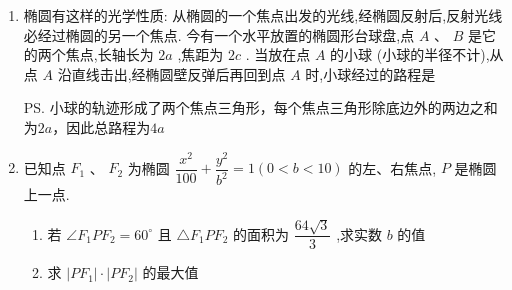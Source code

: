 \begin{enumerate}
\begin{jieda}
    \end{jieda}
    \item 椭圆有这样的光学性质: 从椭圆的一个焦点出发的光线,经椭圆反射后,反射光线必经过椭圆的另一个焦点. 今有一个水平放置的椭圆形台球盘,点 $A$ 、 $B$ 是它的两个焦点,长轴长为 ${2a}$ ,焦距为 ${2c}$ . 当放在点 $A$ 的小球 (小球的半径不计),从点 $A$ 沿直线击出,经椭圆壁反弹后再回到点 $A$ 时,小球经过的路程是
    \begin{jieda}
        \ps 小球的轨迹形成了两个焦点三角形，每个焦点三角形除底边外的两边之和为$2a$，因此总路程为$4a$
    \end{jieda}
    \item 已知点 ${F}_{1}$ 、 ${F}_{2}$ 为椭圆 $\dfrac{{x}^{2}}{100} + \dfrac{{y}^{2}}{{b}^{2}} = 1\left( {0 < b < {10}}\right)$ 的左、右焦点, $P$ 是椭圆上一点.
    \begin{enumerate}
        \item 若 $\angle {F}_{1}P{F}_{2} = {60}^{ \circ  }$ 且 $\bigtriangleup {F}_{1}P{F}_{2}$ 的面积为 $\dfrac{{64}\sqrt{3}}{3}$ ,求实数 $b$ 的值
        \item 求 $\left| {P{F}_{1}}\right|  \cdot  \left| {P{F}_{2}}\right|$ 的最大值
    \end{enumerate}
    \begin{jieda}
\end{jieda}
\end{enumerate}
